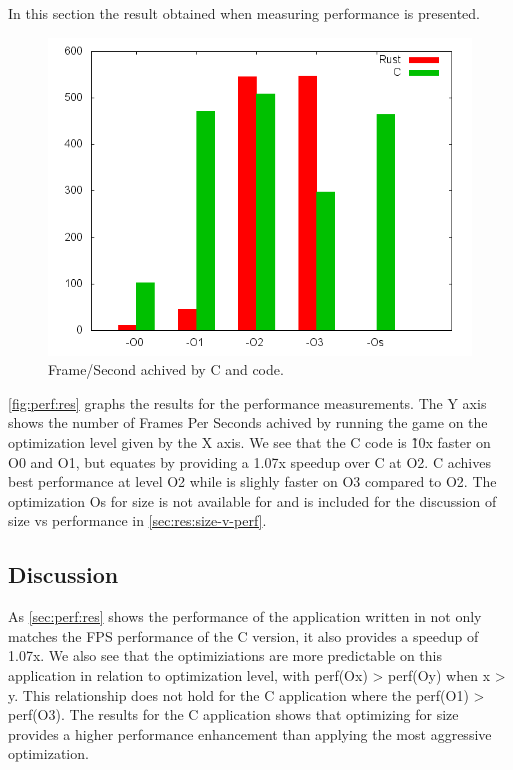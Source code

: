 In this section the result obtained when measuring performance is presented.

\begin{figure}[H]
  \begin{center}
    \includegraphics[scale=0.5]{results/plots/perf/perf.png}
  \end{center}
  \caption{Frame/Second achived by C and \rust code.}
  \label{fig:perf:res}
\end{figure}

\autoref{fig:perf:res} graphs the results for the performance measurements.
The Y axis shows the number of Frames Per Seconds achived by running the game on the optimization level given by the X axis.
We see that the C code is \~10x faster on O0 and O1, but \rust equates by providing a 1.07x speedup over C at O2.
C achives best performance at level O2 while \rust is slighly faster on O3 compared to O2.
The optimization Os for size is not available for \rust and is included for the discussion of size vs performance in \autoref{sec:res:size-v-perf}.

\subsection{Discussion}
\label{sec:perf:disc}
As \autoref{sec:perf:res} shows the performance of the application written in \rust not only matches the FPS performance of the C version, it also provides a speedup of 1.07x.
We also see that the optimiziations are more predictable on this application in relation to optimization level, with perf(Ox) > perf(Oy) when x > y.
This relationship does not hold for the C application where the perf(O1) > perf(O3).
The results for the C application shows that optimizing for size provides a higher performance enhancement than applying the most aggressive optimization.

